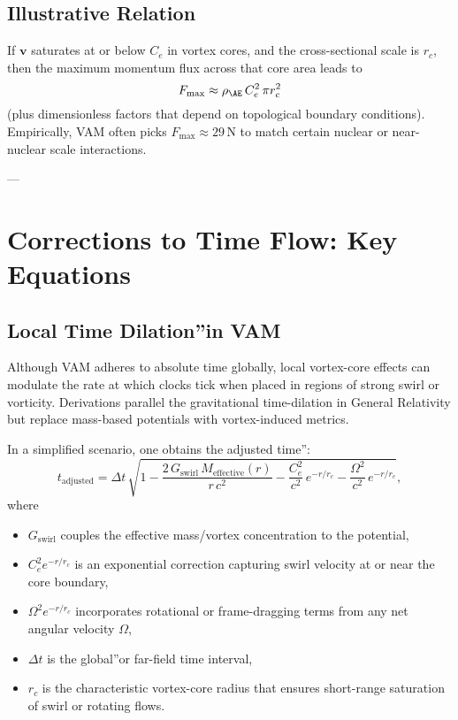 \subsection{Illustrative Relation}
If \(\mathbf{v}\) saturates at or below \(C_e\) in vortex cores, and the cross-sectional scale is \(r_c\), then the maximum momentum flux across that core area leads to
\[
    F_{\max}    \approx  \rho_{\mathrm{\AE}}\, C_e^2\, \pi r_c^2
\]
(plus dimensionless factors that depend on topological boundary conditions). Empirically, VAM often picks \(F_{\max}\approx 29\,\mathrm{N}\) to match certain nuclear or near-nuclear scale interactions.

---

\section{Corrections to Time Flow: Key Equations}

\subsection{Local Time \grqq Dilation\textquotedblright in VAM}
Although VAM adheres to absolute time globally, local vortex-core effects can modulate the rate at which clocks tick when placed in regions of strong swirl or vorticity. Derivations parallel the gravitational time-dilation in General Relativity but replace mass-based potentials with vortex-induced metrics.

In a simplified scenario, one obtains the \grqq adjusted time\textquotedblright:
\[
    t_\text{adjusted} =   \Delta t \,\sqrt{
        1 - \frac{2\,G_\text{swirl}\,M_\text{effective}(r)}{r\,c^2} - \frac{C_e^2}{c^2} \, e^{-r/r_c} - \frac{\Omega^2}{c^2} \, e^{-r/r_c}
    },
\]
where
\begin{itemize}
    \item \(G_\text{swirl}\) couples the effective mass/vortex concentration to the potential,
    \item \(C_e^2 e^{-r/r_c}\) is an exponential correction capturing swirl velocity at or near the core boundary,
    \item \(\Omega^2 e^{-r/r_c}\) incorporates rotational or frame-dragging terms from any net angular velocity \(\Omega\),
    \item \(\Delta t\) is the \grqq global\textquotedblright or far-field time interval,
    \item \(r_c\) is the characteristic vortex-core radius that ensures short-range saturation of swirl or rotating flows.
\end{itemize}

